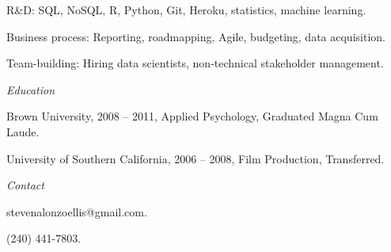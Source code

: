 \documentclass[12pt]{res}
\begin{document}
{\begin{resume}
\begin{list}{}{\leftmargin=1em}
{\item
\begin{list}{-}{\leftmargin=1em}
\item R\&D: SQL, NoSQL, R, Python, Git, Heroku, statistics, machine learning. 
\item Business process: Reporting, roadmapping, Agile, budgeting, data acquisition. 
\item Team-building: Hiring data scientists, non-technical stakeholder management.
\end{list}}
\item
\item{\centering \textit{Education}
\item 
\item
\begin{list}{-}{\leftmargin=1em}
\item Brown University, 2008 -- 2011, Applied Psychology, Graduated Magna Cum Laude. 
\item University of Southern California, 2006 -- 2008, Film Production, Transferred. 
\end{list}}
\item
\item{\centering \textit{Contact}
\item 
\item
\begin{list}{-}{\leftmargin=1em}
\item stevenalonzoellis@gmail.com.
\item (240) 441-7803.
\end{list}}
\item
\end{list}
\end{resume}
} %
\end{document}
